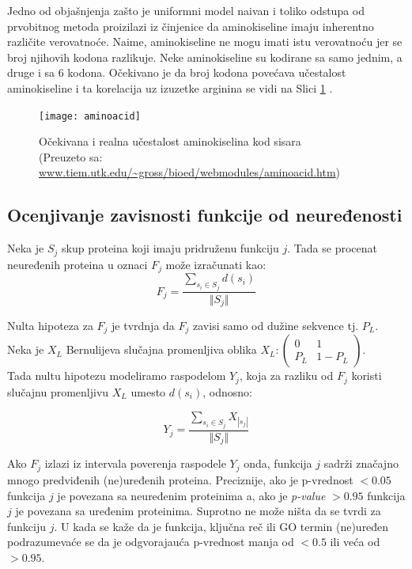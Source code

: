 Jedno od objašnjenja zašto je uniformni model naivan i toliko odstupa od
prvobitnog metoda proizilazi iz činjenice da aminokiseline imaju inherentno
različite verovatnoće. Naime, aminokiseline ne mogu  imati istu
verovatnoću jer se  broj njihovih kodona razlikuje. Neke aminokiseline
su kodirane sa samo jednim, a druge i sa 6 kodona. Očekivano je da broj kodona
povećava učestalost aminokiseline i ta korelacija uz izuzetke arginina se vidi
na Slici \ref{fig:aminoacid} \parencite{AKfrekvencija}.

\begin{figure}[th]
\centering
\texttt{[image: aminoacid]}
\caption{Očekivana i realna učestalost  aminokiselina kod sisara\\ \footnotesize
(Preuzeto sa: \url{www.tiem.utk.edu/~gross/bioed/webmodules/aminoacid.htm})}
\label{fig:aminoacid}
\end{figure}



\clearpage
\subsection{Ocenjivanje zavisnosti funkcije od neuređenosti}

Neka je $S_j$ skup proteina koji imaju pridruženu funkciju $j$. Tada se procenat
neuređenih proteina u oznaci $F_j$ može izračunati kao:
$$F_j = \dfrac{\sum_{s_i \in S_j} d(s_i)} {\Vert S_j \Vert} $$



Nulta hipoteza za $F_j$ je tvrdnja da $F_j$ zavisi samo od dužine sekvence tj. $P_L$. \\
Neka je $X_L$ Bernulijeva slučajna promenljiva oblika $X_L : \begin{pmatrix} 0 & 1\\ P_L & 1-P_L \end{pmatrix}$. \\
Tada nultu hipotezu modeliramo raspodelom $Y_j$, koja za razliku od $F_j$ koristi
slučajnu promenljivu $X_L$ umesto  $d(s_i)$, odnosno:



$$ Y_j = \dfrac {\sum_{s_i \in S_j} {X_{|s_j|}}}{\Vert S_j \Vert}$$

Ako $F_j$ izlazi iz intervala poverenja raspodele $Y_j$ onda, funkcija $j$
sadrži značajno mnogo predviđenih (ne)uređenih proteina. Preciznije,
ako je p-vrednost  $<0.05$ funkcija $j$ je povezana sa neuređenim
proteinima a, ako je \textit{p-value} $>0.95$ funkcija $j$ je povezana sa
uređenim proteinima. Suprotno ne može ništa da se tvrdi za funkciju $j$.  U
kada se kaže da je funkcija, ključna reč ili GO termin (ne)uređen
podrazumevaće se da je odgvorajauća p-vrednost manja od $<0.5$ ili veća
od $>0.95$.


